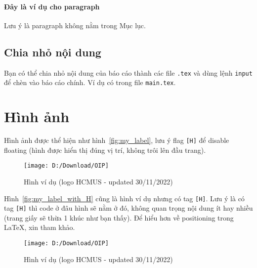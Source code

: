\documentclass[a4paper,14pt]{article}
\begin{document}
	\paragraph{Đây là ví dụ cho paragraph}
	Lưu ý là paragraph không nằm trong Mục lục.
	\subsection{Chia nhỏ nội dung}
	Bạn có thể chia nhỏ nội dung của báo cáo thành các file \texttt{.tex} và dùng lệnh \texttt{input} để chèn vào báo cáo chính. Ví dụ có trong file \texttt{main.tex}.

	\section{Hình ảnh}
	Hình ảnh được thể hiện như hình~\ref{fig:my_label}, lưu ý flag \texttt{[H]} để disable floating (hình được hiển thị đúng vị trí, không trôi lên đầu trang).
	\begin{figure}%
		\centering
		\texttt{[image: D:/Download/OIP]}
		\caption{Hình ví dụ (logo HCMUS - updated 30/11/2022)}
		\label{fig:oip}
	\end{figure}
	Hình~\ref{fig:my_label_with_H} cũng là hình ví dụ nhưng có tag \texttt{[H]}. Lưu ý là có tag \texttt{[H]} thì code ở đâu hình sẽ nằm ở đó, không quan trọng nội dung ít hay nhiều (trang giấy sẽ thừa 1 khúc như bạn thấy). Để hiểu hơn về positioning trong LaTeX, xin tham khảo.
	\begin{figure}[h]
		\centering
		\texttt{[image: D:/Download/OIP]}
		\caption{Hình ví dụ (logo HCMUS - updated 30/11/2022)}
		\label{fig:oip}
	\end{figure}

\end{document}
